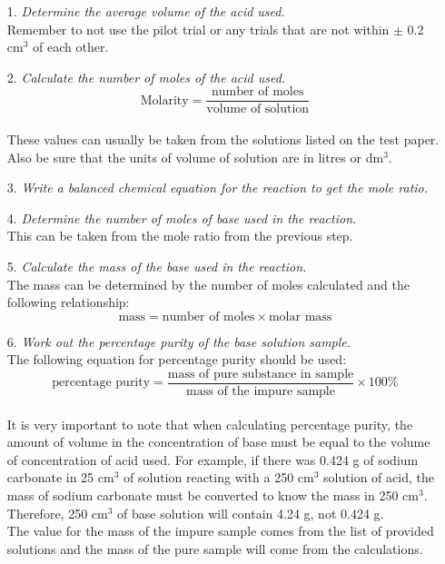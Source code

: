\begin{enumerate}
\item[1.] \textit{Determine the average volume of the acid used.}\\
Remember to not use the pilot trial or any trials that are not within $\pm$ 0.2 cm$^3$ of each other.
\item[2.] \textit{Calculate the number of moles of the acid used.}\\
$$\text{Molarity} = \frac{\text{number of moles}}{\text{volume of solution}}$$\\
These values can usually be taken from the solutions listed on the test paper. Also be sure that the units of volume of solution are in litres or dm$^3$.
\item[3.] \textit{Write a balanced chemical equation for the reaction to get the mole ratio.}
\item[4.] \textit{Determine the number of moles of base used in the reaction.}\\
This can be taken from the mole ratio from the previous step.
\item[5.] \textit{Calculate the mass of the base used in the reaction.}\\
The mass can be determined by the number of moles calculated and the following relationship:\\
$$\text{mass} = \text{number of moles} \times \text{molar mass}$$
\item[6.] \textit{Work out the percentage purity of the base solution sample.}\\
The following equation for percentage purity should be used:\\
$$\text{percentage purity} = \frac{\text{mass of pure substance in sample}}{\text{mass of the impure sample}} \times 100\%$$\\
It is very important to note that when calculating percentage purity, the amount of volume in the concentration of base must be equal to the volume of concentration of acid used. For example, if there was 0.424 g of sodium carbonate in 25 cm$^3$ of solution reacting with a 250 cm$^3$ solution of acid, the mass of sodium carbonate must be converted to know the mass in 250 cm$^3$.  Therefore, 250 cm$^3$ of base solution will contain 4.24 g, not 0.424 g.\\
The value for the mass of the impure sample comes from the list of provided solutions and the mass of the pure sample will come from the calculations.
\end{enumerate}

